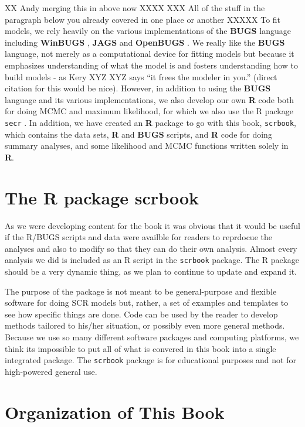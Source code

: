 XX Andy merging this in above now XXXX
XXX All of the stuff in the paragraph below you already covered in one place or another XXXXX
To fit models, we rely heavily on the various implementations of the
{\bf BUGS} language including {\bf WinBUGS} \citep{lunn_etal:2000},
{\bf JAGS} \citep{plummer:2003}
 and {\bf OpenBUGS} \citep{thomas_etal:2006}. We really like
the {\bf BUGS} language, not merely  as a computational device for
fitting models but because it emphasizes
understanding of what the model is and fosters understanding how to
build models - as Kery XYZ XYZ says ``it frees the modeler in you.''  (direct
citation for this would be nice).  However, in addition to using the
{\bf BUGS} language and its various implementations, we also develop our own
{\bf R} code both for doing MCMC
and maximum likelihood, for which we also use the R
package \mbox{\tt secr} \citep{efford:2011}. In addition, we have
created an {\bf R} package to go with this book, \mbox{\tt scrbook},
which contains the data sets, {\bf R} and {\bf BUGS} scripts, and {\bf
  R} code for doing summary analyses, and some likelihood and MCMC
functions written solely in {\bf R}.




\section*{The R package scrbook}

As we were developing content for the book it was obvious that it
would be useful if the R/BUGS scripts and data were availble for
readers to reprdocue the analyses and also to modify so that they can
do their own analysis.  Almost every analysis we did is included as an
R script in the \mbox{\tt scrbook} package.
The R package should be a very dynamic thing, as we plan to
continue to update and expand it.

The purpose of the package is not meant to be general-purpose and
flexible software for doing SCR models but, rather, a set of examples
and templates to see how specific things are done. Code can be used
by the reader to develop methods tailored to his/her situation, or
possibly even more general methods.  Because we use so many different
software packages and computing platforms, we think its impossible to
put all of what is convered in this book into a single integrated
package.  The \mbox{\tt scrbook} package is for educational purposes
and not for high-powered general use.


\section*{Organization of This Book}



